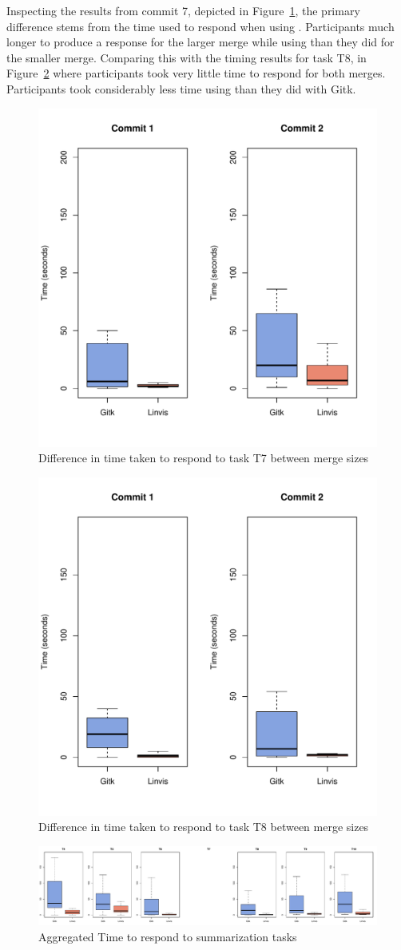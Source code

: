Inspecting the results from commit 7, depicted in
Figure~\ref{fig:task_7_time}, the primary difference stems from the time
used to respond when using \tool{}. Participants much longer to produce
a response for the larger merge while using \tool{} than they did for
the smaller merge. Comparing this with the timing results for task T8,
in Figure~\ref{fig:task_8_time} where participants took very little time
to respond for both merges. Participants took considerably less time
using \tool{} than they did with Gitk.

\begin{figure}[htpb]
  \centering
  \includegraphics[width=0.5\linewidth]{Figures/evaluation/time/7.pdf}
  \caption{Difference in time taken to respond to task T7 between merge sizes}
  \label{fig:task_7_time}
\end{figure}

\begin{figure}[htpb]
  \centering
  \includegraphics[width=0.5\linewidth]{Figures/evaluation/time/8.pdf}
  \caption{Difference in time taken to respond to task T8 between merge sizes}
  \label{fig:task_8_time}
\end{figure}

\begin{figure}[htpb]
  \centering
  \includegraphics[width=0.9\linewidth]{Figures/evaluation/time.pdf}
  \caption{Aggregated Time to respond to summarization tasks}
  \label{fig:agg_time}
\end{figure}

